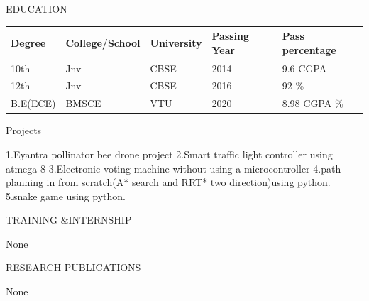 \documentclass[10pt]{article}
\begin{document}
	\begin{minipage}[t][2cm][t]{0.2\textwidth}
	EDUCATION
		
	\end{minipage}
	\begin{minipage}[t][2cm][t]{0.8\textwidth}
		
	\begin{tabular}{ | l |  l |  l |  l |  l |} 
	\hline
	Degree & College/School & University & Passing Year & Pass percentage \\ 
	\hline
	\hline
	10th & Jnv & CBSE & 2014 & 9.6 CGPA  \\ 
\hline
12th & Jnv & CBSE & 2016 & 92 \%  \\ 
\hline
B.E(ECE) & BMSCE & VTU & 2020 & 8.98 CGPA \%  \\ 
\hline
	
	\end{tabular}
	\end{minipage}




	

	
	\begin{minipage}[t][2cm][t]{0.2\textwidth}
		Projects
		
	\end{minipage}
	\begin{minipage}[t][2cm][t]{0.8\textwidth}
		1.Eyantra pollinator bee drone project
		\newline 2.Smart traffic light controller using atmega 8
		\newline 3.Electronic voting machine without using a microcontroller
		\newline 4.path planning in from scratch(A* search and RRT* two direction)using python.
		\newline 5.snake game using python.
		
	\end{minipage}



	

	
	\begin{minipage}[t][2cm][t]{0.2\textwidth}
		TRAINING \&INTERNSHIP
		
	\end{minipage}
	\begin{minipage}[t][2cm][t]{0.8\textwidth}
		None

	\end{minipage}
	
		

		
	\begin{minipage}[t][2cm][t]{0.2\textwidth}
		RESEARCH PUBLICATIONS
		
	\end{minipage}
	\begin{minipage}[t][2cm][t]{0.8\textwidth}
		None
		
	\end{minipage}
\end{document}
